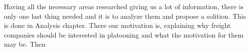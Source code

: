 %
Having all the necessary areas researched giving us a lot of information, there is only one last thing needed and it is to analyze them and propose a solition. This is done in Analysis chapter. There our motivation is, explaining why freight companies should be interested in platooning and what the motivation for them may be. Then \par
%